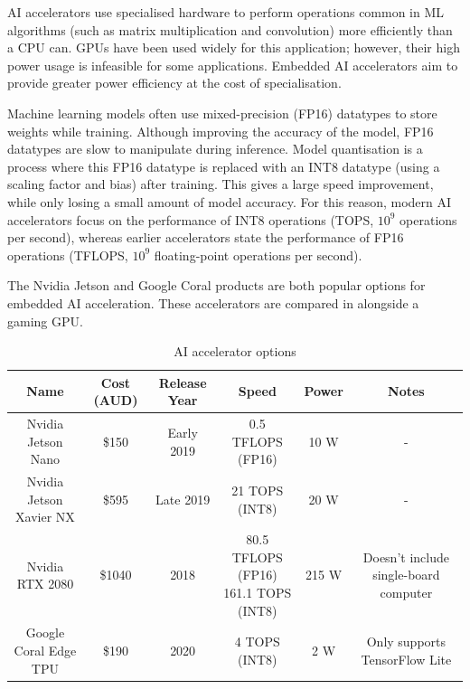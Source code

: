 AI accelerators use specialised hardware to perform operations common in ML algorithms (such as matrix multiplication
and convolution) more efficiently than a CPU can. GPUs have been used widely for this application; however, their high
power usage is infeasible for some applications. Embedded AI accelerators aim to provide greater power efficiency
at the cost of specialisation.

Machine learning models often use mixed-precision (FP16) datatypes to store weights while training. Although improving the accuracy
of the model, FP16 datatypes are slow to manipulate during inference. Model quantisation \cite{jacobQuantizationTrainingNeural2017} is a process where this FP16 datatype is replaced with an
INT8 datatype (using a scaling factor and bias) after training.
This gives a large speed improvement, while only losing a small amount
of model accuracy.
For this reason, modern AI accelerators focus on the performance of INT8 operations (TOPS, $10^9$ operations per second),
whereas earlier accelerators state the performance of FP16 operations (TFLOPS, $10^9$ floating-point
operations per second).

The Nvidia Jetson and Google Coral products are both popular options for embedded AI acceleration. These accelerators are compared
in  alongside a gaming GPU. 

\begin{table}[H]
    \centering
\begin{adjustbox}{width=\textwidth}
    \begin{tabular}{c c c c c c}
    \toprule
    Name & Cost (AUD)\footnotemark[1] & Release Year & Speed & Power & Notes \\
    \midrule
    Nvidia Jetson Nano \cite{nvidiaJetsonNanoSystemonModule2019} & \$150 & Early 2019 & 0.5 TFLOPS (FP16) & 10 W & - \\
    Nvidia Jetson Xavier NX \cite{nvidiaJetsonXavierNX2019} & \$595 & Late 2019 & 21 TOPS (INT8) & 20 W & - \\
    Nvidia RTX 2080 \cite{nvidiaTuringGPUArchitecture2018} & \$1040 & 2018 & \makecell{80.5 TFLOPS (FP16)\\161.1 TOPS (INT8)} & 215 W & Doesn't include single-board computer \\
    Google Coral Edge TPU \cite{googlecoralCoralDevBoard2020} & \$190 & 2020 & 4 TOPS (INT8) & 2 W & Only supports TensorFlow Lite \\
    \bottomrule
    \end{tabular}
\end{adjustbox}
    \caption{AI accelerator options}
    \label{table:compute_element}
\end{table}

